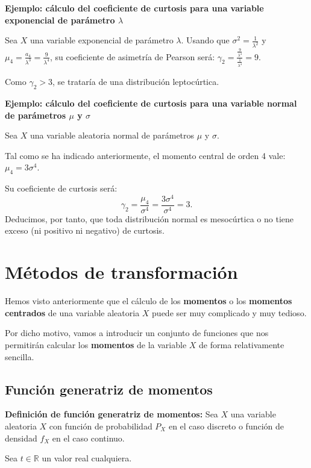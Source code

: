 \documentclass[]{book}
\begin{document}
\textbf{Ejemplo: cálculo del coeficiente de curtosis para una variable exponencial de parámetro \(\lambda\)}

Sea \(X\) una variable exponencial de parámetro \(\lambda\).
Usando que \(\sigma^2=\frac{1}{\lambda^2}\) y \(\mu_4 =\frac{a_4}{\lambda^3}=\frac{9}{\lambda^4}\), su coeficiente de asimetría de Pearson será:
\(\gamma_2 = \frac{\frac{9}{\lambda^4}}{\frac{1}{\lambda^4}}=9.\)

Como \(\gamma_2 >3\), se trataría de una distribución leptocúrtica.

\textbf{Ejemplo: cálculo del coeficiente de curtosis para una variable normal de parámetros \(\mu\) y \(\sigma\)}

Sea \(X\) una variable aleatoria normal de parámetros \(\mu\) y \(\sigma\).

Tal como se ha indicado anteriormente, el momento central de orden 4 vale: \(\mu_4 = 3\sigma^4\).

Su coeficiente de curtosis será:
\[
\gamma_2 =\frac{\mu_4}{\sigma^4}=\frac{3\sigma^4}{\sigma^4}=3.
\]
Deducimos, por tanto, que toda distribución normal es mesocúrtica o no tiene exceso (ni positivo ni negativo) de curtosis.

\hypertarget{muxe9todos-de-transformaciuxf3n}{%
\section{Métodos de transformación}\label{muxe9todos-de-transformaciuxf3n}}

Hemos visto anteriormente que el cálculo de los \textbf{momentos} o los \textbf{momentos centrados} de una variable aleatoria \(X\) puede ser muy complicado y muy tedioso.

Por dicho motivo, vamos a introducir un conjunto de funciones que nos permitirán calcular los \textbf{momentos} de la variable \(X\) de forma relativamente sencilla.

\hypertarget{funciuxf3n-generatriz-de-momentos}{%
\subsection{Función generatriz de momentos}\label{funciuxf3n-generatriz-de-momentos}}

\textbf{Definición de función generatriz de momentos:}
Sea \(X\) una variable aleatoria \(X\) con función de probabilidad \(P_X\) en el caso discreto o función
de densidad \(f_X\) en el caso continuo.

Sea \(t\in\mathbb{R}\) un valor real cualquiera.
\end{document}
